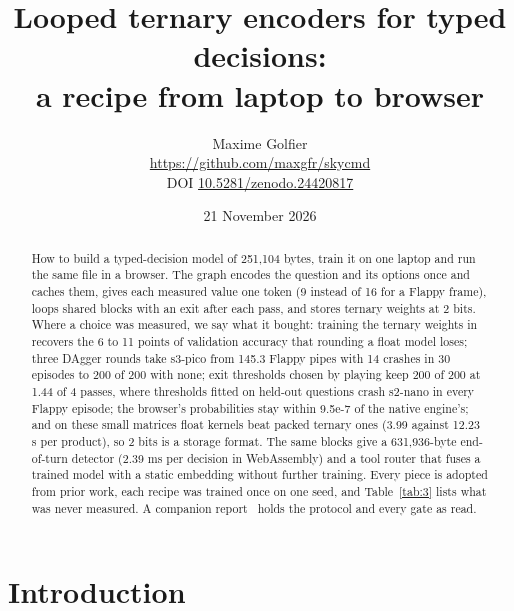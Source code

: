 \documentclass[10pt]{article}
\title{Looped ternary encoders for typed decisions:\\
a recipe from laptop to browser}
\author{Maxime Golfier\\[2pt]
\normalsize\url{https://github.com/maxgfr/skycmd}\\[2pt]
\normalsize DOI \href{https://doi.org/10.5281/zenodo.24420817}{10.5281/zenodo.24420817}}
\date{21 November 2026}
\begin{document}
\maketitle

\begin{abstract}
\noindent How to build a typed-decision model of 251,104 bytes, train it on one laptop and run the same file in a browser. The graph encodes the question and its options once and caches them, gives each measured value one token (9 instead of 16 for a Flappy frame), loops shared blocks with an exit after each pass, and stores ternary weights at 2 bits. Where a choice was measured, we say what it bought: training the ternary weights in recovers the 6 to 11 points of validation accuracy that rounding a float model loses; three DAgger rounds take s3-pico from 145.3 Flappy pipes with 14 crashes in 30 episodes to 200 of 200 with none; exit thresholds chosen by playing keep 200 of 200 at 1.44 of 4 passes, where thresholds fitted on held-out questions crash s2-nano in every Flappy episode; the browser's probabilities stay within 9.5e-7 of the native engine's; and on these small matrices float kernels beat packed ternary ones (3.99 against 12.23 \textmu{}s per product), so 2 bits is a storage format. The same blocks give a 631,936-byte end-of-turn detector (2.39 ms per decision in WebAssembly) and a tool router that fuses a trained model with a static embedding without further training. Every piece is adopted from prior work, each recipe was trained once on one seed, and Table~\ref{tab:3} lists what was never measured. A companion report~\cite{golfier2026skycmd} holds the protocol and every gate as read.
\end{abstract}

\begin{center}
\end{center}

\section{Introduction}\label{sec:1}
\end{document}
